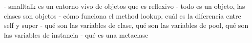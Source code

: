 - smalltalk es un entorno vivo de objetos que es reflexivo
- todo es un objeto, las clases son objetos
- cómo funciona el method lookup, cuál es la diferencia entre self y super
- qué son las variables de clase, qué son las variables de pool, qué son las variables de instancia
- qué es una metaclase